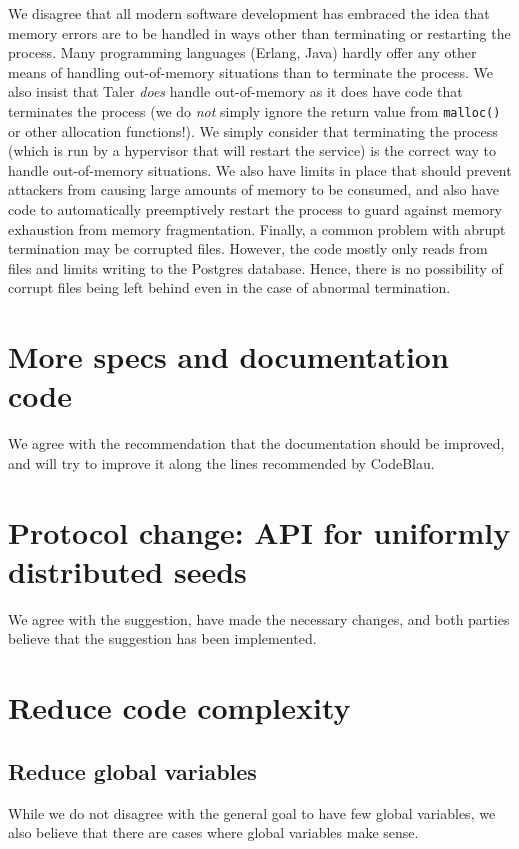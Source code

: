 \documentclass[11pt]{article}
\begin{document}
We disagree that all modern software development has embraced the idea that
memory errors are to be handled in ways other than terminating or restarting
the process. Many programming languages (Erlang, Java) hardly offer any other
means of handling out-of-memory situations than to terminate the process. We
also insist that Taler {\em does} handle out-of-memory as it does have code
that terminates the process (we do {\em not} simply ignore the return value
from {\tt malloc()} or other allocation functions!). We simply consider that
terminating the process (which is run by a hypervisor that will restart the
service) is the correct way to handle out-of-memory situations.  We also have
limits in place that should prevent attackers from causing large amounts of
memory to be consumed, and also have code to automatically preemptively
restart the process to guard against memory exhaustion from memory
fragmentation.  Finally, a common problem with abrupt termination may be
corrupted files.  However, the code mostly only reads from files and limits
writing to the Postgres database. Hence, there is no possibility of corrupt
files being left behind even in the case of abnormal termination.


\section{More specs and documentation code}

We agree with the recommendation that the documentation should be improved,
and will try to improve it along the lines recommended by CodeBlau.

\section{Protocol change: API for uniformly distributed seeds}

We agree with the suggestion, have made the necessary changes, and both
parties believe that the suggestion has been implemented.

\section{Reduce code complexity}

\subsection{Reduce global variables}

While we do not disagree with the general goal to have few global variables,
we also believe that there are cases where global variables make sense.
\end{document}
